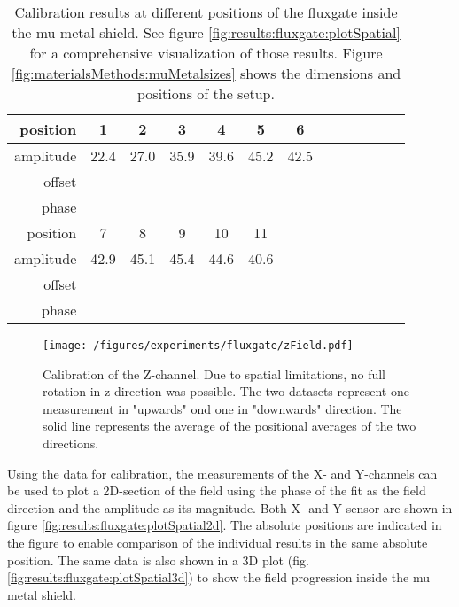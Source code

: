         \begin{table}
            \centering
            \label{table:results:calibrationFitParams}
            \begin{tabular}{r|cccccccccccc}
                \label{table:results:calibrationFitParams}
                position & 1& 2 & 3 & 4 & 5 & 6\\
                \hline
                amplitude & 22.4 & 27.0 & 35.9 & 39.6 & 45.2 & 42.5\\
                offset \\
                phase \\
                \hline
                position & 7 & 8 & 9 & 10 & 11 \\
                \hline
                amplitude & 42.9 & 45.1 & 45.4 & 44.6 & 40.6\\
                offset \\
                phase
            \end{tabular}
            \caption[Fluxgate calibration results]{Calibration results at different positions of the fluxgate inside the mu metal shield. See figure \ref{fig:results:fluxgate:plotSpatial} for a comprehensive visualization of those results. Figure \ref{fig:materialsMethods:muMetalsizes} shows the dimensions and positions of the setup.}
        \end{table}
        \begin{figure}
            \label{fig:results:fluxgate:zcal}
            \centering
            \texttt{[image: /figures/experiments/fluxgate/zField.pdf]}
            \caption[calibration results Z]{Calibration of the Z-channel. Due to spatial limitations, no full rotation in z direction was possible. The two datasets represent one measurement in "upwards" ond one in "downwards" direction. The solid line represents the average of the positional averages of the two directions.}
        \end{figure}
        Using the data for calibration, the measurements of the X- and Y-channels can be used to plot a 2D-section of the field using the phase of the fit as the field direction and the amplitude as its magnitude. Both X- and Y-sensor are shown in figure \ref{fig:results:fluxgate:plotSpatial2d}. The absolute positions are indicated in the figure to enable comparison of the individual results in the same absolute position. The same data is also shown in a 3D plot (fig. \ref{fig:results:fluxgate:plotSpatial3d}) to show the field progression inside the mu metal shield.
